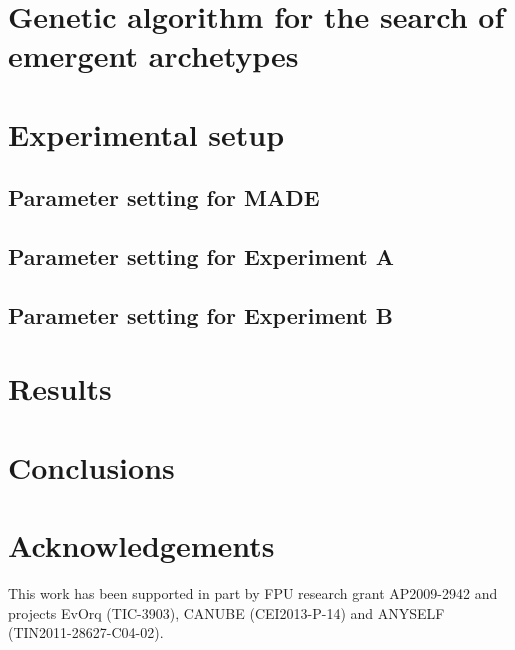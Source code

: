 \documentclass[final,1p,times]{elsarticle}
\begin{document}
\section{Genetic algorithm for the search of emergent archetypes}
\label{sec:ga}

\section{Experimental setup}
\label{sec:experiments}

\subsection{Parameter setting for MADE}

\subsection{Parameter setting for Experiment A}

\subsection{Parameter setting for Experiment B}


\section{Results}
\label{sec:results}


\section{Conclusions}


\section*{Acknowledgements}
This work has been supported in part by FPU research grant AP2009-2942 and projects EvOrq (TIC-3903), CANUBE (CEI2013-P-14) and ANYSELF (TIN2011-28627-C04-02).



\end{document}
